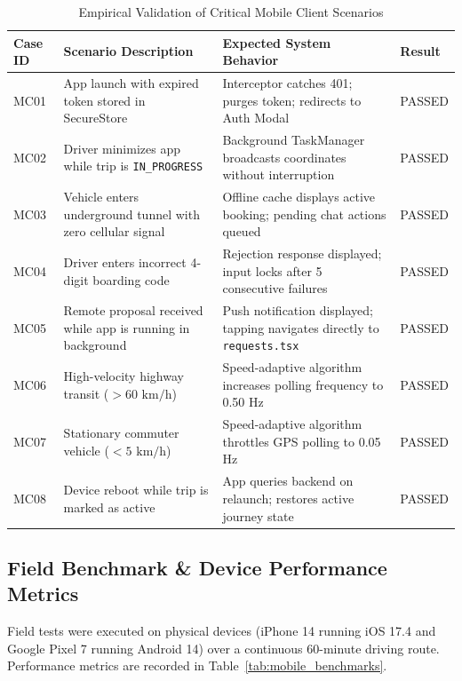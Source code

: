\documentclass[conference,10pt,a4paper]{IEEEtran}
\begin{document}
\begin{table}[!t]
\caption{Empirical Validation of Critical Mobile Client Scenarios}
\label{tab:mobile_test_cases}
\centering
\scriptsize
\begin{tabularx}{\textwidth}{lp{5.5cm}Xl}
\toprule
\textbf{Case ID} & \textbf{Scenario Description} & \textbf{Expected System Behavior} & \textbf{Result} \\
\midrule
MC01 & App launch with expired token stored in SecureStore & Interceptor catches 401; purges token; redirects to Auth Modal & PASSED \\
MC02 & Driver minimizes app while trip is \texttt{IN\_PROGRESS} & Background TaskManager broadcasts coordinates without interruption & PASSED \\
MC03 & Vehicle enters underground tunnel with zero cellular signal & Offline cache displays active booking; pending chat actions queued & PASSED \\
MC04 & Driver enters incorrect 4-digit boarding code & Rejection response displayed; input locks after 5 consecutive failures & PASSED \\
MC05 & Remote proposal received while app is running in background & Push notification displayed; tapping navigates directly to \texttt{requests.tsx} & PASSED \\
MC06 & High-velocity highway transit ($> 60\text{ km/h}$) & Speed-adaptive algorithm increases polling frequency to 0.50 Hz & PASSED \\
MC07 & Stationary commuter vehicle ($< 5\text{ km/h}$) & Speed-adaptive algorithm throttles GPS polling to 0.05 Hz & PASSED \\
MC08 & Device reboot while trip is marked as active & App queries backend on relaunch; restores active journey state & PASSED \\
\bottomrule
\end{tabularx}
\end{table}

\subsection{Field Benchmark \& Device Performance Metrics}
Field tests were executed on physical devices (iPhone 14 running iOS 17.4 and Google Pixel 7 running Android 14) over a continuous 60-minute driving route. Performance metrics are recorded in Table~\ref{tab:mobile_benchmarks}.
\end{document}
